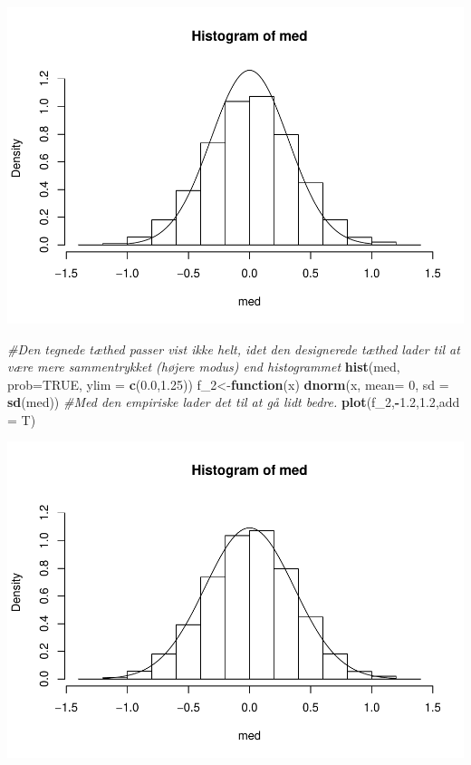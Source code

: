 \documentclass[
]{article}
\newenvironment{Shaded}{\begin{snugshade}}{\end{snugshade}}
\newcommand{\CommentTok}[1]{\textcolor[rgb]{0.56,0.35,0.01}{\textit{#1}}}
\newcommand{\ControlFlowTok}[1]{\textcolor[rgb]{0.13,0.29,0.53}{\textbf{#1}}}
\newcommand{\DataTypeTok}[1]{\textcolor[rgb]{0.13,0.29,0.53}{#1}}
\newcommand{\DecValTok}[1]{\textcolor[rgb]{0.00,0.00,0.81}{#1}}
\newcommand{\FloatTok}[1]{\textcolor[rgb]{0.00,0.00,0.81}{#1}}
\newcommand{\KeywordTok}[1]{\textcolor[rgb]{0.13,0.29,0.53}{\textbf{#1}}}
\newcommand{\NormalTok}[1]{#1}
\newcommand{\OperatorTok}[1]{\textcolor[rgb]{0.81,0.36,0.00}{\textbf{#1}}}
\newcommand{\OtherTok}[1]{\textcolor[rgb]{0.56,0.35,0.01}{#1}}
\begin{document}
\begin{center}\includegraphics{matstatproblems20-21_files/figure-latex/unnamed-chunk-31-1} \end{center}

\begin{Shaded}
\begin{Highlighting}[]
\CommentTok{#Den tegnede tæthed passer vist ikke helt, idet den designerede tæthed lader til at være mere sammentrykket (højere modus) end histogrammet}
\KeywordTok{hist}\NormalTok{(med, }\DataTypeTok{prob=}\OtherTok{TRUE}\NormalTok{, }\DataTypeTok{ylim =} \KeywordTok{c}\NormalTok{(}\FloatTok{0.0}\NormalTok{,}\FloatTok{1.25}\NormalTok{))}
\NormalTok{f_}\DecValTok{2}\NormalTok{<-}\ControlFlowTok{function}\NormalTok{(x) }\KeywordTok{dnorm}\NormalTok{(x, }\DataTypeTok{mean=} \DecValTok{0}\NormalTok{, }\DataTypeTok{sd =} \KeywordTok{sd}\NormalTok{(med))}
\CommentTok{#Med den empiriske lader det til at gå lidt bedre.}
\KeywordTok{plot}\NormalTok{(f_}\DecValTok{2}\NormalTok{,}\OperatorTok{-}\FloatTok{1.2}\NormalTok{,}\FloatTok{1.2}\NormalTok{,}\DataTypeTok{add =}\NormalTok{ T)}
\end{Highlighting}
\end{Shaded}

\begin{center}\includegraphics{matstatproblems20-21_files/figure-latex/unnamed-chunk-31-2} \end{center}
\end{document}
